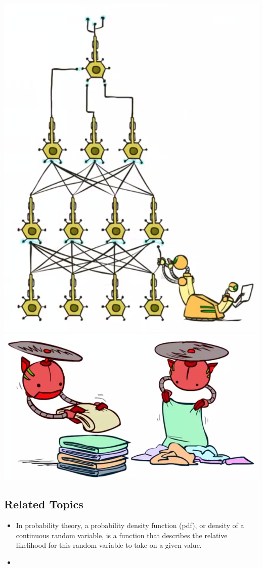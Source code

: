 \documentclass[twocolumn]{article}
\begin{document}
{\includegraphics[scale=0.5]{snapshot168}\\
\includegraphics[scale=0.5]{snapshot169}\\
}

\twocolumn{}

\subsection{Related Topics}
\label{sec:related-topics}

\begin{itemize}
\item In probability theory, a probability density function (pdf), or
  density of a continuous random variable, is a function that
  describes the relative likelihood for this random variable to take
  on a given value. 
\item 
\end{itemize}
\end{document}
